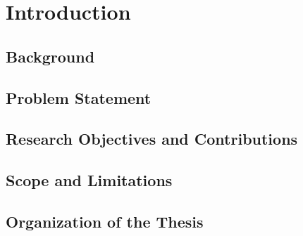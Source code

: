 %
%
%

\chapter{Introduction}
\label{ch:intro}

\section{Background}
\label{sec:intro-background}

\section{Problem Statement}
\label{sec:intro-problem}

\section{Research Objectives and Contributions}
\label{sec:intro-objectives}

\section{Scope and Limitations}
\label{sec:intro-scope}

\section{Organization of the Thesis}
\label{sec:intro-organization}
